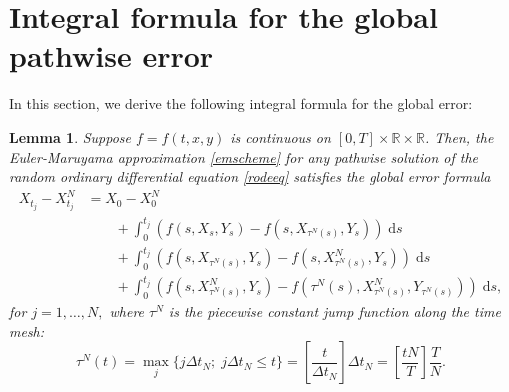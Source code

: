 \documentclass[reqno,12pt]{amsart}
\theoremstyle{plain}%
\newtheorem{lem}{Lemma}[section]
\theoremstyle{definition}
\begin{document}
\section{Integral formula for the global pathwise error}

In this section, we derive the following integral formula for the global error:
\begin{lem}
    Suppose $f=f(t, x, y)$ is continuous on $[0, T]\times \mathbb{R}\times \mathbb{R}$. Then, the Euler-Maruyama approximation \eqref{emscheme} for any pathwise solution of the random ordinary differential equation \eqref{rodeeq} satisfies the global error formula
    \begin{equation}
        \label{globalerrorintegralformula}
        \begin{aligned}
            X_{t_j} - X_{t_j}^N & = X_0 - X_0^N \\
            & \qquad + \int_0^{t_j} \left( f(s, X_s, Y_s) - f(s, X_{\tau^N(s)}, Y_s) \right)\;\mathrm{d}s  \\ 
            & \qquad + \int_{0}^{t_j} \left( f(s, X_{\tau^N(s)}, Y_s) - f(s, X_{\tau^N(s)}^N, Y_s) \right)\;\mathrm{d}s \\
            & \qquad + \int_0^{t_j} \left( f(s, X_{\tau^N(s)}^N, Y_s) - f(\tau^N(s), X_{\tau^N(s)}^N, Y_{\tau^N(s)}) \right)\;\mathrm{d}s,
        \end{aligned}
    \end{equation}
    for $j = 1, \ldots, N,$ where $\tau^N$ is the piecewise constant jump function along the time mesh:
    \begin{equation}
        \label{tauNt}
        \tau^N(t) = \max_j\{j\Delta t_N; \; j\Delta t_N \leq t\} = \left[\frac{t}{\Delta t_N}\right]\Delta t_N = \left[\frac{tN}{T}\right]\frac{T}{N}.
    \end{equation}
\end{lem}
\end{document}

